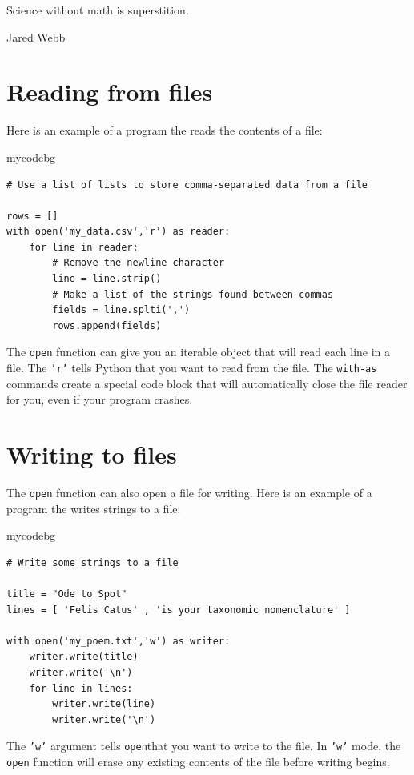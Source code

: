 
\epigraph{Science without math is superstition.}{Jared Webb}

\minitoc

\section{Reading from files}
Here is an example of a program the reads the contents of a file:
\begin{tsession}{mycodebg}
\begin{verbatim}
# Use a list of lists to store comma-separated data from a file

rows = []
with open('my_data.csv','r') as reader:
    for line in reader:
        # Remove the newline character
        line = line.strip()
        # Make a list of the strings found between commas
        fields = line.splti(',')
        rows.append(fields)
\end{verbatim}
\end{tsession}
The \texttt{open} function can give you an iterable object that will read each line in a file.
The \texttt{'r'} tells Python that you want to read from the file.
The \texttt{with-as} commands create a special code block
that will automatically close the file reader for you,
even if your program crashes.

\section{Writing to files}
The \texttt{open} function can also open a file for writing.
Here is an example of a program the writes strings to a file:
\begin{tsession}{mycodebg}
\begin{verbatim}
# Write some strings to a file

title = "Ode to Spot"
lines = [ 'Felis Catus' , 'is your taxonomic nomenclature' ]

with open('my_poem.txt','w') as writer:
    writer.write(title)
    writer.write('\n')
    for line in lines:
        writer.write(line)
        writer.write('\n')
\end{verbatim}
\end{tsession}
The \texttt{'w'} argument tells \texttt{open}that you want to write to the file.
In \texttt{'w'} mode, the \texttt{open} function will erase
any existing contents of the file before writing begins.

